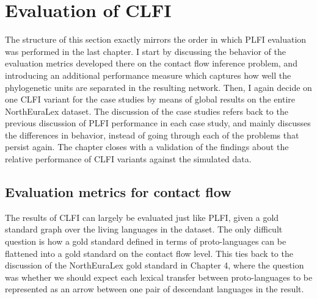 \section{Evaluation of CLFI}
The structure of this section exactly mirrors the order in which PLFI evaluation was performed in the last chapter. I start by discussing the behavior of the evaluation metrics developed there on the contact flow inference problem, and introducing an additional performance measure which captures how well the phylogenetic units are separated in the resulting network. Then, I again decide on one CLFI variant for the case studies by means of global results on the entire NorthEuraLex dataset. The discussion of the case studies refers back to the previous discussion of PLFI performance in each case study, and mainly discusses the differences in behavior, instead of going through each of the problems that persist again. The chapter closes with a validation of the findings about the relative performance of CLFI variants against the simulated data.

\subsection{Evaluation metrics for contact flow}
The results of CLFI can largely be evaluated just like PLFI, given a gold standard graph over the living languages in the dataset. The only difficult question is how a gold standard defined in terms of proto-languages can be flattened into a gold standard on the contact flow level. This ties back to the discussion of the NorthEuraLex gold standard in Chapter 4, where the question was whether we should expect each lexical transfer between proto-languages to be represented as an arrow between one pair of descendant languages in the result.

